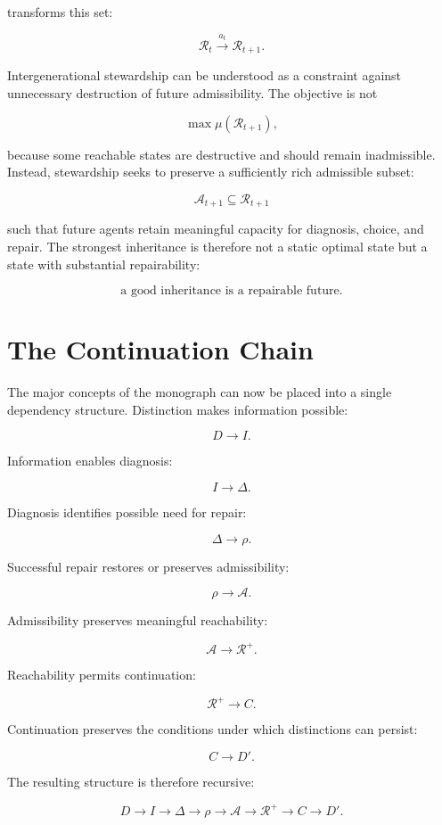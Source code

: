 \documentclass[11pt,oneside]{book}
\theoremstyle{definition}
\theoremstyle{remark}
\begin{document}
transforms this set:

\[
\mathcal{R}_t \xrightarrow{a_t} \mathcal{R}_{t+1}.
\]

Intergenerational stewardship can be understood as a constraint against unnecessary destruction of
future admissibility. The objective is not

\[
\max \mu(\mathcal{R}_{t+1}),
\]

because some reachable states are destructive and should remain inadmissible. Instead, stewardship
seeks to preserve a sufficiently rich admissible subset:

\[
\mathcal{A}_{t+1} \subseteq \mathcal{R}_{t+1}
\]

such that future agents retain meaningful capacity for diagnosis, choice, and repair. The strongest
inheritance is therefore not a static optimal state but a state with substantial repairability:

\[
\boxed{ \text{a good inheritance is a repairable future}. }
\]

\section{The Continuation Chain}

The major concepts of the monograph can now be placed into a single dependency structure.
Distinction makes information possible:

\[
D\rightarrow I.
\]

Information enables diagnosis:

\[
I\rightarrow\Delta.
\]

Diagnosis identifies possible need for repair:

\[
\Delta\rightarrow\rho.
\]

Successful repair restores or preserves admissibility:

\[
\rho\rightarrow\mathcal{A}.
\]

Admissibility preserves meaningful reachability:

\[
\mathcal{A}\rightarrow\mathcal{R}^{+}.
\]

Reachability permits continuation:

\[
\mathcal{R}^{+}\rightarrow C.
\]

Continuation preserves the conditions under which distinctions can persist:

\[
C\rightarrow D'.
\]

The resulting structure is therefore recursive:

\[
D \rightarrow I \rightarrow \Delta \rightarrow \rho \rightarrow \mathcal{A} \rightarrow \mathcal{R}^{+} \rightarrow C \rightarrow D'.
\]
\end{document}
